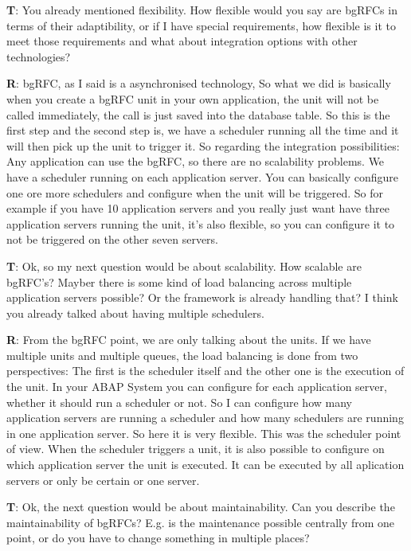 \begin{list}{X:}{\setlength{\labelsep}{5mm}}
 \item[\textbf{T}:] You already mentioned flexibility. How flexible would you say are bgRFCs in terms of their adaptibility, or if I have special requirements, how flexible is it to meet those requirements and what about integration options with other technologies?
 \item[\textbf{R}:] bgRFC, as I said is a asynchronised technology, So what we did is basically when you create a bgRFC unit in your own application, the unit will not be called immediately, the call is just saved into the database table. So this is the first step and the second step is, we have a scheduler running all the time and it will then pick up the unit to trigger it. So regarding the integration possibilities: Any application can use the bgRFC, so there are no scalability problems. We have a scheduler running on each application server. You can basically configure one ore more schedulers and configure when the unit will be triggered. So for example if you have 10 application servers and you really just want have three application servers running the unit, it's also flexible, so you can configure it to not be triggered on the other seven servers. 
 \item[\textbf{T}:] Ok, so my next question would be about scalability. How scalable are bgRFC's? Mayber there is some kind of load balancing across multiple application servers possible? Or the framework is already handling that? I think you already talked about having multiple schedulers.
 \item[\textbf{R}:] From the bgRFC point, we are only talking about the units. If we have multiple units and multiple queues, the load balancing is done from two perspectives: The first is the scheduler itself and the other one is the execution of the unit. In your ABAP System you can configure for each application server, whether it should run a scheduler or not. So I can configure how many application servers are running a scheduler and how many schedulers are running in one application server. So here it is very flexible. This was the scheduler point of view. When the scheduler triggers a unit, it is also possible to configure on which application server the unit is executed. It can be executed by all aplication servers or only be certain or one server.
 \item[\textbf{T}:] Ok, the next question would be about maintainability. Can you describe the maintainability of bgRFCs? E.g. is the maintenance possible centrally from one point, or do you have to change something in multiple places?

\end{list}
